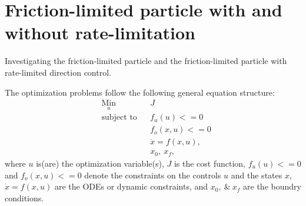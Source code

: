 \chapter[Particle model optimization]{Friction-limited particle with and without rate-limitation}
Investigating the friction-limited particle and the friction-limited particle with rate-limited direction control. 

The optimization problems follow the following general equation structure: 
\begin{align}
    & \underset{u}{\text{Min}}
    & & J\\
%
    & \text{subject to} 
    & & f_u(u) <= 0\\
%
    &&& f_o(x,u) <= 0 \\
%
    &&& \dot x = f(x,u),\\
%
    &&& x_0,\ x_f,
\end{align}
where $u$ is(are) the optimization variable(s), $J$ is the cost function, $f_u(u) <= 0$ and $f_o(x,u) <= 0$ denote the constraints on the controls $u$ and the states $x$, $\dot x = f(x,u)$ are the ODEs or dynamic constraints, and $x_0,\ \&\ x_f$ are the boundry conditions. 

